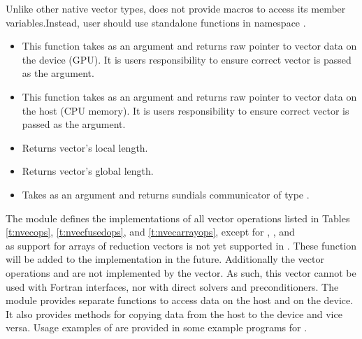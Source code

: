 Unlike other native {\sundials} vector types, {\nvecraja} does not provide macros
to access its member variables.Instead, user should use standalone functions in
namespace .
\begin{itemize}

\item

  This function takes  as an argument and returns raw pointer to vector
  data on the device (GPU). It is users responsibility to ensure correct vector is
  passed as the argument.

\item

  This function takes  as an argument and returns raw pointer to vector
  data on the host (CPU memory). It is users responsibility to ensure correct vector is
  passed as the argument.

\item {}

  Returns vector's local length.


\item {}

  Returns vector's global length.


\item {}

  Takes  as an argument and returns sundials communicator of type
  .

\end{itemize}


The {\nvecraja} module defines the implementations of all vector operations listed
in Tables \ref{t:nvecops}, \ref{t:nvecfusedops}, and \ref{t:nvecarrayops}, except
for , , and \\ \noindent
{} as support for arrays of reduction vectors is not
yet supported in {\raja}. These function will be added to the {\nvecraja}
implementation in the future. Additionally the vector operations  and
 are not implemented by the {\raja} vector.
As such, this vector cannot be used with {\sundials} Fortran interfaces,
nor with {\sundials} direct solvers and preconditioners.
The {\nvecraja} module provides separate functions to access data on the host
and on the device. It also provides methods for copying data from the host to
the device and vice versa. Usage examples of {\nvecraja} are provided in
some example programs for {\cvode} \cite{cvode_ex}.

